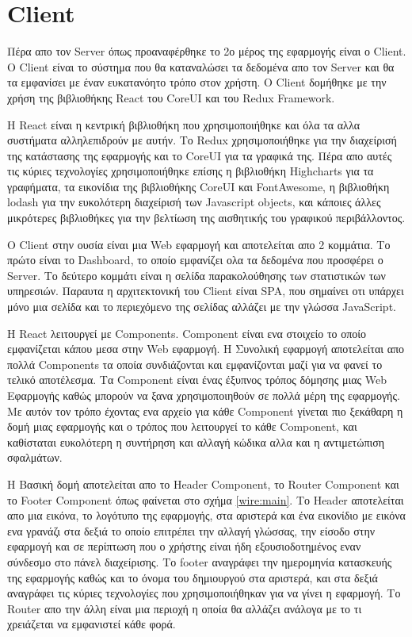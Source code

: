 \section{Client}
Πέρα απο τον Server όπως προαναφέρθηκε το 2ο μέρος της εφαρμογής είναι ο Client. Ο Client είναι το σύστημα που θα καταναλώσει τα δεδομένα απο τον Server και θα τα εμφανίσει με έναν ευκατανόητο τρόπο στον χρήστη. Ο Client δομήθηκε με την χρήση της βιβλιοθήκης React του CoreUI και του Redux Framework.

Η React είναι η κεντρική βιβλιοθήκη που χρησιμοποιήθηκε και όλα τα αλλα συστήματα αλληλεπιδρούν με αυτήν. Το Redux χρησιμοποιήθηκε για την διαχείρισή της κατάστασης της εφαρμογής και το CoreUI για τα γραφικά της. Πέρα απο αυτές τις κύριες τεχνολογίες χρησιμοποιήθηκε επίσης η βιβλιοθήκη Highcharts για τα γραφήματα, τα εικονίδια της βιβλιοθήκης CoreUI και FontAwesome, η βιβλιοθήκη lodash για την ευκολότερη διαχείρισή των Javascript objects, και κάποιες άλλες μικρότερες βιβλιοθήκες για την βελτίωση της αισθητικής του γραφικού περιβάλλοντος. 

Ο Client στην ουσία είναι μια Web εφαρμογή και αποτελείται απο 2 κομμάτια. Το πρώτο είναι το Dashboard, το οποίο εμφανίζει ολα τα δεδομένα που προσφέρει ο Server. Το δεύτερο κομμάτι είναι η σελίδα παρακολούθησης των στατιστικών των υπηρεσιών. Παραυτα η αρχιτεκτονική του Client είναι SPA, που σημαίνει οτι υπάρχει μόνο μια σελίδα και το περιεχόμενο της σελίδας αλλάζει με την γλώσσα JavaScript. 

Η React λειτουργεί με Components. Component είναι ενα στοιχείο το οποίο εμφανίζεται κάπου μεσα στην Web εφαρμογή. Η Συνολική εφαρμογή αποτελείται απο πολλά Components τα οποία συνδιάζονται και εμφανίζονται μαζί για να φανεί το τελικό αποτέλεσμα. Τα Component είναι ένας έξυπνος τρόπος δόμησης μιας Web Εφαρμογής καθώς μπορούν να ξανα χρησιμοποιηθούν σε πολλά μέρη της εφαρμογής. Με αυτόν τον τρόπο έχοντας ενα αρχείο για κάθε Component γίνεται πιο ξεκάθαρη η δομή μιας εφαρμογής και ο τρόπος που λειτουργεί το κάθε Component, και καθίσταται ευκολότερη η συντήρηση και αλλαγή κώδικα αλλα και η αντιμετώπιση σφαλμάτων. 

Η Βασική δομή αποτελείται απο το Header Component, το Router Component και το Footer Component όπως φαίνεται στο σχήμα \ref{wire:main}. Το Header αποτελείται απο μια εικόνα, το λογότυπο της εφαρμογής, στα αριστερά και ένα εικονίδιο με εικόνα ενα γρανάζι στα δεξιά το οποίο επιτρέπει την αλλαγή γλώσσας, την είσοδο στην εφαρμογή και σε περίπτωση που ο χρήστης είναι ήδη εξουσιοδοτημένος εναν σύνδεσμο στο πάνελ διαχείρισης. Το footer αναγράφει την ημερομηνία κατασκευής της εφαρμογής καθώς και το όνομα του δημιουργού στα αριστερά, και στα δεξιά αναγράφει τις κύριες τεχνολογίες που χρησιμοποιήθηκαν για να γίνει η εφαρμογή. Το Router απο την άλλη είναι μια περιοχή η οποία θα αλλάζει ανάλογα με το τι χρειάζεται να εμφανιστεί κάθε φορά.

